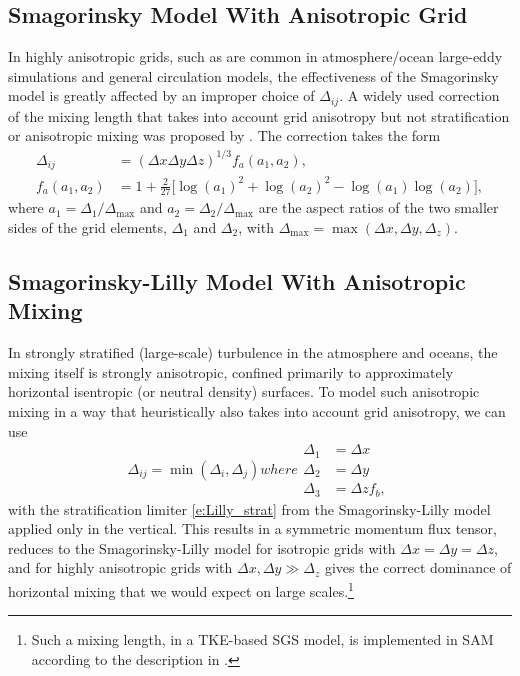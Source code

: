 \documentclass{report}
\begin{document}
\subsection{Smagorinsky Model With Anisotropic Grid}
 
In highly anisotropic grids, such as are common in atmosphere/ocean large-eddy simulations and general circulation models, the effectiveness of the Smagorinsky model is greatly affected by an improper choice of $\Delta_{ij}$. A widely used correction of the mixing length that takes into account grid anisotropy but not stratification or anisotropic mixing was proposed by  \citet{scottiMeneveauLilly1993}. The correction takes the form
\begin{subequations}\label{e:anisotropic_Smagorinsky}
\begin{align}
\Delta_{ij} &= (\Delta x \Delta y \Delta z)^{1/3} f_{a}(a_1, a_2),   \\
f_a(a_1, a_2) &= 1+\frac{2}{27}\Big[\log(a_{1})^2 + \log(a_2)^2 -\log(a_1)\log(a_2)\Big],
\end{align}
\end{subequations}
where  $a_1 =  \Delta_1/\Delta_{\max}$ and $a_2 = \Delta_2/\Delta_{\max}$ are the aspect ratios of the two smaller sides of the grid elements, $\Delta_1$ and $\Delta_2$, with $\Delta_{\max} = \max(\Delta x, \Delta y, \Delta_z)$. 

\subsection{Smagorinsky-Lilly Model With Anisotropic Mixing}\label{s:anisotropic_SGS_mixing}

In strongly stratified (large-scale) turbulence in the atmosphere and oceans, the mixing itself is strongly anisotropic, confined primarily to approximately horizontal isentropic (or neutral density) surfaces. To model such anisotropic mixing in a way that heuristically also takes into account grid anisotropy, we can use 
\begin{subequations}\label{e:anisotropic_Smag-Lilly}
\begin{equation}
\Delta_{ij} = \min(\Delta_i, \Delta_j)  
\end{equation}
where 
\begin{align}
\Delta_1 & = \Delta x \\
\Delta_2 & = \Delta y \\
\Delta_3 & = \Delta z f_b,
\end{align}
\end{subequations}
with the stratification limiter \eqref{e:Lilly_strat} from the Smagorinsky-Lilly model applied only in the vertical. This results in a symmetric momentum flux tensor, reduces to the Smagorinsky-Lilly model for isotropic grids with $\Delta x = \Delta y = \Delta z$, and for highly anisotropic grids with $\Delta x, \Delta y \gg \Delta_z$ gives the correct dominance of horizontal mixing that we would expect on large scales.\footnote{Such a mixing length, in a TKE-based SGS model, is implemented in SAM according to the description in \citet{Stevens05a}.}
\end{document}
